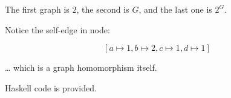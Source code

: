\documentclass[a4paper,notitlepage]{article}
\begin{document}
\begin{enumerate}
\begin{multicols}{2}
     \end{multicols}

     {\Large
     \begin{dot2tex}[fdp,autosize,scale=0.5]
       
     \end{dot2tex}
     }
     
     The first graph is $2$, the second is $G$, and the last one is $2^G$.

     Notice the self-edge in node:

     $$ \left [ a \mapsto 1, b \mapsto 2, c \mapsto 1, d \mapsto 1 \right ] $$

     … which is a graph homomorphism itself.

     Haskell code is provided.

     
\end{enumerate}
\end{document}
